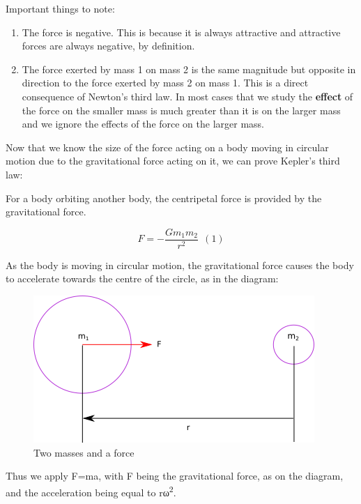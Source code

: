\documentclass[main.tex]{subfiles}
\begin{document}
Important things to note:

\begin{enumerate}
\def\labelenumi{\arabic{enumi}.}
\item
  The force is negative. This is because it is always attractive and
  attractive forces are always negative, by definition.
\item
  The force exerted by mass 1 on mass 2 is the same magnitude but
  opposite in direction to the force exerted by mass 2 on mass 1. This
  is a direct consequence of Newton's third law. In most cases that we
  study the \textbf{effect} of the force on the smaller mass is much
  greater than it is on the larger mass and we ignore the effects of the
  force on the larger mass.
\end{enumerate}




Now that we know the size of the force acting on a body moving in
circular motion due to the gravitational force acting on it, we can
prove Kepler's third law:

For a body orbiting another body, the centripetal force is provided by
the gravitational force.

\[F = - \frac{Gm_{1}m_{2}}{r^{2}}\ \ (1)\]

As the body is moving in circular motion, the gravitational force causes
the body to accelerate towards the centre of the circle, as in the
diagram:

\begin{figure}[h]
  \begin{center}
    \includegraphics{figs/chapt-13/masses-direction.png}
  \end{center}
  \label{masses-2}
  \caption{Two masses and a force}
\end{figure}

Thus we apply F=ma, with F being the gravitational force, as on the
diagram, and the acceleration being equal to rω\textsuperscript{2}.
\end{document}
